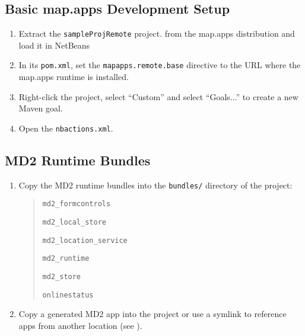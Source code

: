 
\subsection{Basic map.apps Development Setup}

\begin{enumerate}
\item Extract the \texttt{sampleProjRemote} project. from the map.apps distribution and load it in NetBeans
\item In its \texttt{pom.xml},
 set the \texttt{mapapps.remote.base} directive to the URL where the map.apps runtime is installed.
\item Right-click the project, select \enquote{Custom} and select \enquote{Goals...} to create a new Maven goal. 
\item Open the \texttt{nbactions.xml}. 

\end{enumerate}

\subsection{MD2 Runtime Bundles}
\begin{enumerate}
\item Copy the MD2 runtime bundles into the \texttt{bundles/} directory of the project:
	\begin{quotation}
		 \texttt{md2\_formcontrols}
		 
		 \texttt{md2\_local\_store}
		 
		 \texttt{md2\_location\_service}
		 
		 \texttt{md2\_runtime}
		 
		 \texttt{md2\_store}
		 
		 \texttt{onlinestatus}
	\end{quotation}

\item Copy a generated MD2 app into the project or use a symlink to reference apps from another location (see ).
\end{enumerate}